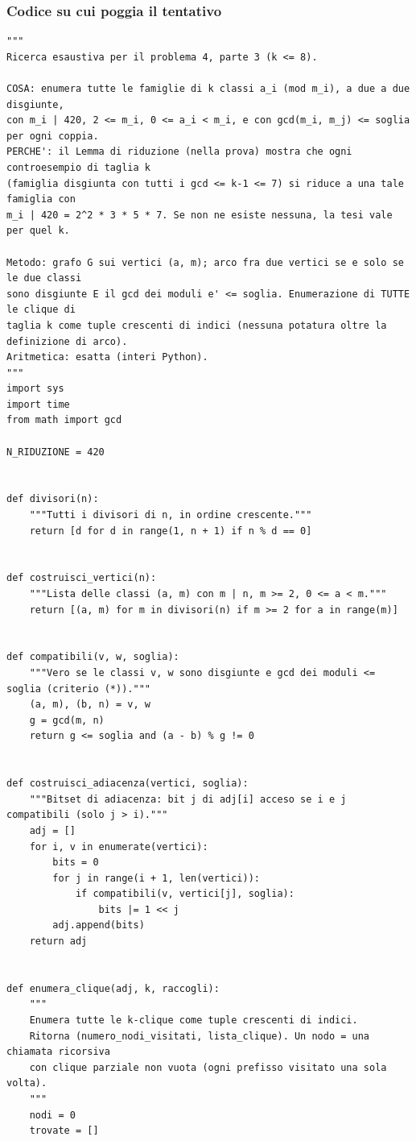 \documentclass[11pt,a4paper]{article}
\begin{document}
\subsubsection{Codice su cui poggia il tentativo}
\begin{lstlisting}[caption={attempt\_001 code\_1 [python, rigore exact] — Implementation 1 (certificate): exhaustive enumeration of all k-cliques in G\_k on the 1343 — approvato dal Referee}]
"""
Ricerca esaustiva per il problema 4, parte 3 (k <= 8).

COSA: enumera tutte le famiglie di k classi a_i (mod m_i), a due a due disgiunte,
con m_i | 420, 2 <= m_i, 0 <= a_i < m_i, e con gcd(m_i, m_j) <= soglia per ogni coppia.
PERCHE': il Lemma di riduzione (nella prova) mostra che ogni controesempio di taglia k
(famiglia disgiunta con tutti i gcd <= k-1 <= 7) si riduce a una tale famiglia con
m_i | 420 = 2^2 * 3 * 5 * 7. Se non ne esiste nessuna, la tesi vale per quel k.

Metodo: grafo G sui vertici (a, m); arco fra due vertici se e solo se le due classi
sono disgiunte E il gcd dei moduli e' <= soglia. Enumerazione di TUTTE le clique di
taglia k come tuple crescenti di indici (nessuna potatura oltre la definizione di arco).
Aritmetica: esatta (interi Python).
"""
import sys
import time
from math import gcd

N_RIDUZIONE = 420


def divisori(n):
    """Tutti i divisori di n, in ordine crescente."""
    return [d for d in range(1, n + 1) if n % d == 0]


def costruisci_vertici(n):
    """Lista delle classi (a, m) con m | n, m >= 2, 0 <= a < m."""
    return [(a, m) for m in divisori(n) if m >= 2 for a in range(m)]


def compatibili(v, w, soglia):
    """Vero se le classi v, w sono disgiunte e gcd dei moduli <= soglia (criterio (*))."""
    (a, m), (b, n) = v, w
    g = gcd(m, n)
    return g <= soglia and (a - b) % g != 0


def costruisci_adiacenza(vertici, soglia):
    """Bitset di adiacenza: bit j di adj[i] acceso se i e j compatibili (solo j > i)."""
    adj = []
    for i, v in enumerate(vertici):
        bits = 0
        for j in range(i + 1, len(vertici)):
            if compatibili(v, vertici[j], soglia):
                bits |= 1 << j
        adj.append(bits)
    return adj


def enumera_clique(adj, k, raccogli):
    """
    Enumera tutte le k-clique come tuple crescenti di indici.
    Ritorna (numero_nodi_visitati, lista_clique). Un nodo = una chiamata ricorsiva
    con clique parziale non vuota (ogni prefisso visitato una sola volta).
    """
    nodi = 0
    trovate = []


\end{lstlisting}
\end{document}
